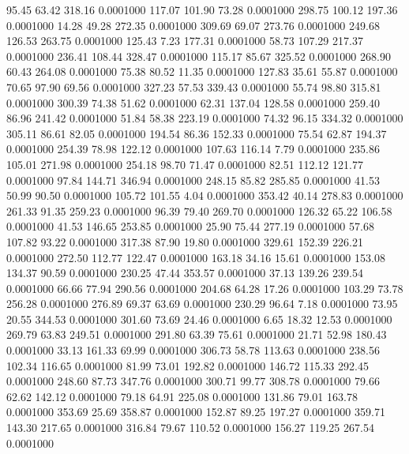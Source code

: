   95.45   63.42  318.16   0.0001000
 117.07  101.90   73.28   0.0001000
 298.75  100.12  197.36   0.0001000
  14.28   49.28  272.35   0.0001000
 309.69   69.07  273.76   0.0001000
 249.68  126.53  263.75   0.0001000
 125.43    7.23  177.31   0.0001000
  58.73  107.29  217.37   0.0001000
 236.41  108.44  328.47   0.0001000
 115.17   85.67  325.52   0.0001000
 268.90   60.43  264.08   0.0001000
  75.38   80.52   11.35   0.0001000
 127.83   35.61   55.87   0.0001000
  70.65   97.90   69.56   0.0001000
 327.23   57.53  339.43   0.0001000
  55.74   98.80  315.81   0.0001000
 300.39   74.38   51.62   0.0001000
  62.31  137.04  128.58   0.0001000
 259.40   86.96  241.42   0.0001000
  51.84   58.38  223.19   0.0001000
  74.32   96.15  334.32   0.0001000
 305.11   86.61   82.05   0.0001000
 194.54   86.36  152.33   0.0001000
  75.54   62.87  194.37   0.0001000
 254.39   78.98  122.12   0.0001000
 107.63  116.14    7.79   0.0001000
 235.86  105.01  271.98   0.0001000
 254.18   98.70   71.47   0.0001000
  82.51  112.12  121.77   0.0001000
  97.84  144.71  346.94   0.0001000
 248.15   85.82  285.85   0.0001000
  41.53   50.99   90.50   0.0001000
 105.72  101.55    4.04   0.0001000
 353.42   40.14  278.83   0.0001000
 261.33   91.35  259.23   0.0001000
  96.39   79.40  269.70   0.0001000
 126.32   65.22  106.58   0.0001000
  41.53  146.65  253.85   0.0001000
  25.90   75.44  277.19   0.0001000
  57.68  107.82   93.22   0.0001000
 317.38   87.90   19.80   0.0001000
 329.61  152.39  226.21   0.0001000
 272.50  112.77  122.47   0.0001000
 163.18   34.16   15.61   0.0001000
 153.08  134.37   90.59   0.0001000
 230.25   47.44  353.57   0.0001000
  37.13  139.26  239.54   0.0001000
  66.66   77.94  290.56   0.0001000
 204.68   64.28   17.26   0.0001000
 103.29   73.78  256.28   0.0001000
 276.89   69.37   63.69   0.0001000
 230.29   96.64    7.18   0.0001000
  73.95   20.55  344.53   0.0001000
 301.60   73.69   24.46   0.0001000
   6.65   18.32   12.53   0.0001000
 269.79   63.83  249.51   0.0001000
 291.80   63.39   75.61   0.0001000
  21.71   52.98  180.43   0.0001000
  33.13  161.33   69.99   0.0001000
 306.73   58.78  113.63   0.0001000
 238.56  102.34  116.65   0.0001000
  81.99   73.01  192.82   0.0001000
 146.72  115.33  292.45   0.0001000
 248.60   87.73  347.76   0.0001000
 300.71   99.77  308.78   0.0001000
  79.66   62.62  142.12   0.0001000
  79.18   64.91  225.08   0.0001000
 131.86   79.01  163.78   0.0001000
 353.69   25.69  358.87   0.0001000
 152.87   89.25  197.27   0.0001000
 359.71  143.30  217.65   0.0001000
 316.84   79.67  110.52   0.0001000
 156.27  119.25  267.54   0.0001000
